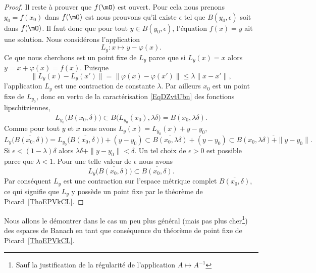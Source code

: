 \begin{proof}
	Il reste à prouver que \( f(\mO)\) est ouvert. Pour cela nous prenons \( y_0=f(x_0)\) dans \( f(\mO)\) est nous prouvons qu'il existe \( \epsilon\) tel que \( B(y_0,\epsilon)\) soit dans \( f(\mO)\). Il faut donc que pour tout \( y\in B(y_0,\epsilon)\), l'équation \( f(x)=y\) ait une solution. Nous considérons l'application
	\begin{equation}
		L_y\colon x\mapsto y-\varphi(x).
	\end{equation}
	Ce que nous cherchons est un point fixe de \( L_y\) parce que si \( L_y(x)=x\) alors \( y=x+\varphi(x)=f(x)\). Puisque
	\begin{equation}
		\big\| L_y(x)-L_y(x') \big\|=\big\| \varphi(x)-\varphi(x') \big\|\leq\lambda\| x-x' \|,
	\end{equation}
	l'application \( L_y\) est une contraction de constante \( \lambda\). Par ailleurs \( x_0\) est un point fixe de \( L_{y_0}\), donc en vertu de la caractérisation \eqref{EqDZvtUbn} des fonctions lipschitziennes,
	\begin{equation}
		L_{y_0}\big( \overline{ B(x_0,\delta) } \big)\subset \overline{ B\big( L_{y_0}(x_0),\lambda\delta \big) }=\overline{ B(x_0,\lambda\delta) }.
	\end{equation}
	Comme pour tout \( y\) et \( x\) nous avons \( L_y(x)=L_{y_0}(x)+y-y_0\),
	\begin{equation}
		L_y\big( \overline{ B(x_0,\delta) } \big)=L_{y_0}\big( \overline{ B(x_0,\delta) } \big)+(y-y_0)\subset \overline{ B(x_0,\lambda\delta) }+(y-y_0)\subset \overline{ B(x_0,\lambda\delta)+\| y-y_0 \| }.
	\end{equation}
	Si \( \epsilon<(1-\lambda)\delta\) alors \( \lambda\delta+\| y-y_0 \|<\delta\). Un tel choix de \( \epsilon>0\) est possible parce que \( \lambda<1\). Pour une telle valeur de \( \epsilon\) nous avons
	\begin{equation}
		L_y\big( \overline{ B(x_0,\delta) } \big)\subset \overline{ B(x_0,\delta) }.
	\end{equation}
	Par conséquent \( L_y\) est une contraction sur l'espace métrique complet \( \overline{ B(x_0,\delta) }\), ce qui signifie que \( L_y\) y possède un point fixe par le théorème de Picard~\ref{ThoEPVkCL}.
\end{proof}

Nous allons le démontrer dans le cas un peu plus général (mais pas plus cher\footnote{Sauf la justification de la régularité de l'application \( A\mapsto A^{-1}\)}) des espaces de Banach en tant que conséquence du théorème de point fixe de Picard~\ref{ThoEPVkCL}.


